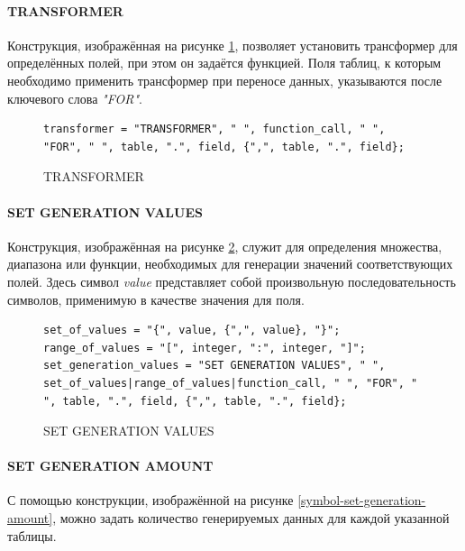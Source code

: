 \paragraph{TRANSFORMER}

Конструкция, изображённая на рисунке \ref{symbol-transformer}, позволяет установить трансформер для определённых полей, при этом он задаётся функцией. Поля таблиц, к которым необходимо применить трансформер при переносе данных, указываются после ключевого слова \textit{"FOR"}.

\begin{figure}
  \begin{lstlisting}
transformer = "TRANSFORMER", " ", function_call, " ", "FOR", " ", table, ".", field, {",", table, ".", field};
  \end{lstlisting}
  \caption{TRANSFORMER}
  \label{symbol-transformer}
\end{figure}

\paragraph{SET GENERATION VALUES}

Конструкция, изображённая на рисунке \ref{symbol-set-generation-values}, служит для определения множества, диапазона или функции, необходимых для генерации значений соответствующих полей. Здесь символ \textit{value} представляет собой произвольную последовательность символов, применимую в качестве значения для поля.

\begin{figure}
  \begin{lstlisting}
set_of_values = "{", value, {",", value}, "}";
range_of_values = "[", integer, ":", integer, "]";
set_generation_values = "SET GENERATION VALUES", " ", set_of_values|range_of_values|function_call, " ", "FOR", " ", table, ".", field, {",", table, ".", field};
  \end{lstlisting}
  \caption{SET GENERATION VALUES}
  \label{symbol-set-generation-values}
\end{figure}

\paragraph{SET GENERATION AMOUNT}

С помощью конструкции, изображённой на рисунке \ref{symbol-set-generation-amount}, можно задать количество генерируемых данных для каждой указанной таблицы.


